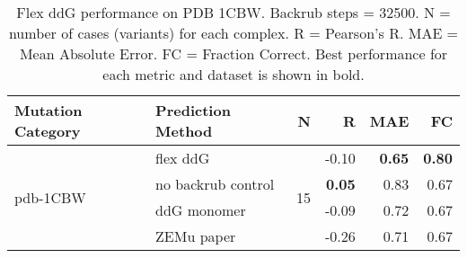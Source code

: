 \begin{table}
  \begin{tabular}{llrrrr}
\toprule
Mutation Category &   Prediction Method &   N &     R &  MAE &   FC \\
\midrule
 \multirow{ 4}{*}{pdb-1CBW} & flex ddG & \multirow{ 4}{*}{15} & -0.10 & \textbf{0.65} & \textbf{0.80}  \\
 & no backrub control & & \textbf{0.05} & 0.83 & 0.67  \\
 & ddG monomer & & -0.09 & 0.72 & 0.67  \\
 & ZEMu paper & & -0.26 & 0.71 & 0.67  \\
\bottomrule
\end{tabular}
  \caption[Flex ddG performance on PDB 1CBW]{
    Flex ddG performance on PDB 1CBW. Backrub steps = 32500. N = number of cases (variants) for each complex. R = Pearson's R. MAE = Mean Absolute Error. FC = Fraction Correct. Best performance for each metric and dataset is shown in bold.
  } \label{tab:table-pdb-1CBW}
\end{table}
